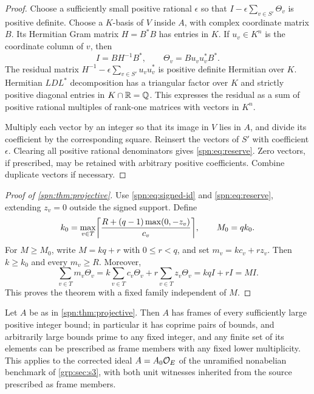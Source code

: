 \begin{proof}
Choose a sufficiently small positive rational $\epsilon$ so that
$I-\epsilon\sum_{v\in S'}\Theta_v$ is positive definite. Choose a $K$-basis of
$V$ inside $A$, with complex coordinate matrix $B$. Its Hermitian Gram matrix
$H=B^*B$ has entries in $K$. If $u_v\in K^n$ is the coordinate column of $v$,
then
\[
 I=BH^{-1}B^*,\qquad\Theta_v=Bu_vu_v^*B^* .
\]
The residual matrix $H^{-1}-\epsilon\sum_{v\in S'}u_vu_v^*$ is positive
definite Hermitian over $K$. Hermitian $LDL^*$ decomposition has a triangular
factor over $K$ and strictly positive diagonal entries in $K\cap\mathbb{R}=\mathbb{Q}$. This
expresses the residual as a sum of positive rational multiples of rank-one
matrices with vectors in $K^n$.

Multiply each vector by an integer so that its image in $V$ lies in $A$, and
divide its coefficient by the corresponding square. Reinsert the vectors of
$S'$ with coefficient $\epsilon$. Clearing all positive rational denominators
gives \eqref{spn:eq:reserve}. Zero vectors, if prescribed, may be retained
with arbitrary positive coefficients. Combine duplicate vectors if necessary.
\end{proof}

\begin{proof}[Proof of \cref{spn:thm:projective}]
Use \eqref{spn:eq:signed-id} and \eqref{spn:eq:reserve}, extending $z_v=0$
outside the signed support. Define
\begin{equation}\label{spn:eq:explicit-threshold}
 k_0=\max_{v\in T}\ceil*{\frac{R+(q-1)\max(0,-z_v)}{c_v}},\qquad M_0=qk_0 .
\end{equation}
For $M\ge M_0$, write $M=kq+r$ with $0\le r<q$, and set $m_v=kc_v+rz_v$. Then
$k\ge k_0$ and every $m_v\ge R$. Moreover,
\[
 \sum_{v\in T}m_v\Theta_v=k\sum_{v\in T}c_v\Theta_v+r\sum_{v\in T}z_v\Theta_v
 =kqI+rI=MI .
\]
This proves the theorem with a fixed family independent of $M$.
\end{proof}

\begin{corollary}\label{spn:cor:coprime}
Let $A$ be as in \cref{spn:thm:projective}. Then $A$ has frames of every
sufficiently large positive integer bound; in particular it has coprime pairs
of bounds, and arbitrarily large bounds prime to any fixed integer, and any
finite set of its elements can be prescribed as frame members with any fixed
lower multiplicity. This applies to the corrected ideal $A=A_0\mathcal{O}_E$ of the
unramified nonabelian benchmark of \cref{grp:sec:s3}, with both unit witnesses
inherited from the source prescribed as frame members.
\end{corollary}

